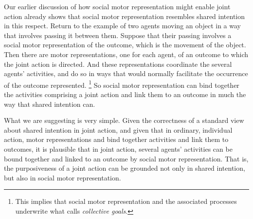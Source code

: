 \documentclass[12pt,\papersize]{extarticle}
\begin{document}

Our earlier discussion of how social motor representation might enable joint action already shows that social motor representation resembles shared intention in this respect.
Return to the example of two agents moving an object in a way that involves passing it between them.
Suppose that their passing involves a social motor representation of the outcome,
which is the movement of the object. 
Then there are motor representations, one for each agent, 
of an outcome to which the joint action is directed.
And these representations coordinate the several agents' activities,
and 
do so in ways that would normally facilitate the occurrence of the  outcome represented.%
\footnote{
This implies that social motor representation and the associated processes underwrite what \citet{Butterfill:2011_wija} calls \textit{collective goals}.
}
So social motor representation can bind together the activities comprising a joint action and link them to an outcome in much the way that shared intention can.



What we are suggesting is very simple.
Given the correctness of a standard view about shared intention in joint action, 
and 
given that in ordinary, individual action, motor representations and bind together activities and link them to outcomes,
it is plausible that 
in joint action, several agents' activities can be bound together and linked to an outcome by social motor representation.
That is,
the purposiveness of a joint action can be grounded not only in shared intention, but also in social motor representation.
\end{document}
